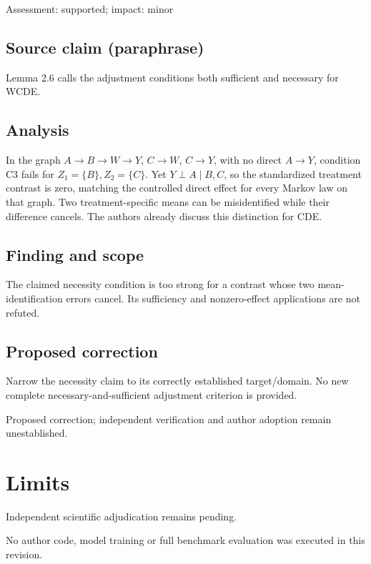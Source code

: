 \documentclass[11pt]{article}
\begin{document}
Assessment: supported; impact: minor

\subsection*{Source claim (paraphrase)}

Lemma 2.6 calls the adjustment conditions both sufficient and necessary for WCDE.

\subsection*{Analysis}

In the graph \(A\to B\to W\to Y\), \(C\to W\), \(C\to Y\), with no direct \(A\to Y\), condition C3 fails for \(Z_1=\{B\},Z_2=\{C\}\). Yet \(Y\perp A\mid B,C\), so the standardized treatment contrast is zero, matching the controlled direct effect for every Markov law on that graph. Two treatment-specific means can be misidentified while their difference cancels. The authors already discuss this distinction for CDE.

\subsection*{Finding and scope}

The claimed necessity condition is too strong for a contrast whose two mean-identification errors cancel. Its sufficiency and nonzero-effect applications are not refuted.

\subsection*{Proposed correction}

Narrow the necessity claim to its correctly established target/domain. No new complete necessary-and-sufficient adjustment criterion is provided.

Proposed correction; independent verification and author adoption remain unestablished.

\section*{Limits}

Independent scientific adjudication remains pending.\par

No author code, model training or full benchmark evaluation was executed in this revision.\par
\end{document}

